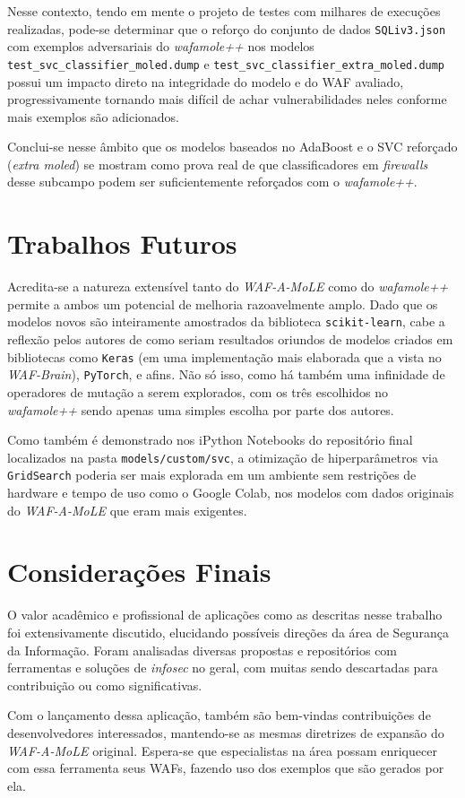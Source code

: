 Nesse contexto, tendo em mente o projeto de testes com milhares de execuções realizadas, pode-se determinar que o reforço do conjunto de dados \verb+SQLiv3.json+ com exemplos adversariais do \textit{wafamole++} nos modelos \verb+test_svc_classifier_moled.dump+ e \linebreak \verb+test_svc_classifier_extra_moled.dump+ possui um impacto direto na integridade do modelo e do WAF avaliado, progressivamente tornando mais difícil de achar vulnerabilidades neles conforme mais exemplos são adicionados.

Conclui-se nesse âmbito que os modelos baseados no AdaBoost e o SVC reforçado (\textit{extra moled}) se mostram como prova real de que classificadores em \textit{firewalls} desse subcampo podem ser suficientemente reforçados com o \textit{wafamole++}.


\section{Trabalhos Futuros}
Acredita-se a natureza extensível tanto do \textit{WAF-A-MoLE} como do \textit{wafamole++} permite a ambos um potencial de melhoria razoavelmente amplo. Dado que os modelos novos são inteiramente amostrados da biblioteca \verb+scikit-learn+, cabe a reflexão pelos autores de como seriam resultados oriundos de modelos criados em bibliotecas como \verb+Keras+ (em uma implementação mais elaborada que a vista no \textit{WAF-Brain}), \verb+PyTorch+, e afins. Não só isso, como há também uma infinidade de operadores de mutação a serem explorados, com os três escolhidos no \textit{wafamole++} sendo apenas uma simples escolha por parte dos autores.

Como também é demonstrado nos iPython Notebooks do repositório final localizados na pasta \verb+models/custom/svc+, a otimização de hiperparâmetros via \verb+GridSearch+ poderia ser mais explorada em um ambiente sem restrições de hardware e tempo de uso como o Google Colab, nos modelos com dados originais do \textit{WAF-A-MoLE} que eram mais exigentes. 

\section{Considerações Finais}
O valor acadêmico e profissional de aplicações como as descritas nesse trabalho foi extensivamente discutido, elucidando possíveis direções da área de Segurança da Informação. Foram analisadas diversas propostas e repositórios com ferramentas e soluções de \textit{infosec} no geral, com muitas sendo descartadas para contribuição ou como significativas. 

Com o lançamento dessa aplicação, também são bem-vindas contribuições de desenvolvedores interessados, mantendo-se as mesmas diretrizes de expansão do \textit{WAF-A-MoLE} original. Espera-se que especialistas na área possam enriquecer com essa ferramenta seus WAFs, fazendo uso dos exemplos que são gerados por ela.
